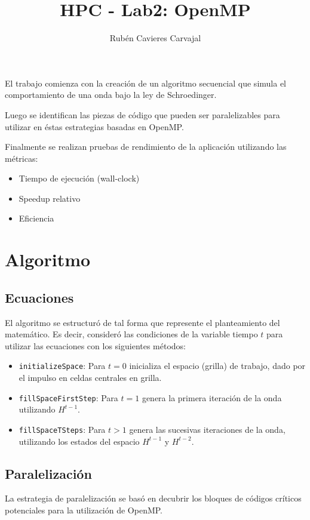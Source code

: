 \documentclass[jou]{apa6}
\title{HPC - Lab2: OpenMP}
\author{Rubén Cavieres Carvajal}
\affiliation{Universidad de Santiago de Chile}
\begin{document}
\maketitle
El trabajo comienza con la creación de un algoritmo secuencial que simula el comportamiento de una onda bajo la ley de Schroedinger.

Luego se identifican las piezas de código que pueden ser paralelizables para utilizar en éstas estrategias basadas en OpenMP.

Finalmente se realizan pruebas de rendimiento de la aplicación utilizando las métricas:

\begin{itemize}
	\item Tiempo de ejecución (wall-clock)
	\item Speedup relativo
	\item Eficiencia
\end{itemize}


\section{Algoritmo}
\subsection{Ecuaciones}
El algoritmo se estructuró de tal forma que represente el planteamiento del matemático. Es decir, consideró las condiciones de la variable tiempo $t$ para utilizar las ecuaciones con los siguientes métodos:

\begin{itemize}
	\item \texttt{initializeSpace}: Para $t = 0$ inicializa el espacio (grilla) de trabajo, dado por el impulso en celdas centrales en grilla.
	\item \texttt{fillSpaceFirstStep}: Para $t = 1$ genera la primera iteración de la onda utilizando $H^{t-1}$.
	\item \texttt{fillSpaceTSteps}: Para $t > 1$ genera las sucesivas iteraciones de la onda, utilizando los estados del espacio $H^{t-1}$ y $H^{t-2}$.
\end{itemize}

\subsection{Paralelización}
La estrategia de paralelización se basó en decubrir los bloques de códigos críticos potenciales para la utilización de OpenMP.
\end{document}
